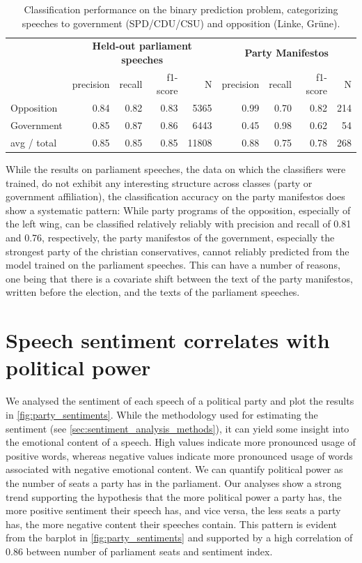 \documentclass{article} %
\begin{document}
\begin{table}[t]
\begin{center}
\begin{tabular}{lrrrrrrrr}
& \multicolumn{4}{c}{\bf Held-out parliament speeches} & \multicolumn{4}{c}{\bf Party Manifestos}\\
    &         precision    &recall &  f1-score  & N    &         precision    &recall &  f1-score  & N\\
\hline \hline
      Opposition   &  0.84  &    0.82  &    0.83  &    5365 & 0.99   &   0.70    &  0.82    &   214\\
     Government   &    0.85  &    0.87    &  0.86  &    6443 & 0.45    &  0.98  &    0.62  &      54\\
\hline
avg / total    &  0.85  &    0.85  &     0.85    & 11808 & 0.88   &   0.75    &  0.78 &      268\\
%
\end{tabular}
\end{center}
\caption{
\label{tab:results_binary}
Classification performance on the binary prediction problem, categorizing speeches to government (SPD/CDU/CSU) and opposition (Linke, Gr\"une).
}
\end{table}


While the results on parliament speeches, the data on which the classifiers were trained, do not exhibit any interesting structure across classes (party or government affiliation), the classification accuracy on the party manifestos does show a systematic pattern: While party programs of the opposition, especially of the left wing, can be classified relatively reliably with precision and recall of 0.81 and 0.76, respectively, the party manifestos of the government, especially the strongest party of the christian conservatives, cannot reliably predicted from the model trained on the parliament speeches. This can have a number of reasons, one being that there is a covariate shift between the text of the party manifestos, written before the election, and the texts of the parliament speeches. 


\section{Speech sentiment correlates with political power}\label{sec:sentiment_result}
We analysed the sentiment of each speech of a political party and plot the results in \autoref{fig:party_sentiments}. While the methodology used for estimating the sentiment (see \autoref{sec:sentiment_analysis_methods}), it can yield some insight into the emotional content of a speech. High values indicate more pronounced usage of positive words, whereas negative values indicate more pronounced usage of words associated with negative emotional content. We can quantify political power as the number of seats a party has in the parliament. Our analyses show a strong trend supporting the hypothesis that the more political power a party has, the more positive sentiment their speech has, and vice versa, the less seats a party has, the more negative content their speeches contain. This pattern is evident from the barplot in \autoref{fig:party_sentiments} and supported by a high correlation of 0.86 between number of parliament seats and sentiment index.
\end{document}
